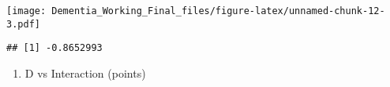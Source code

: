 \documentclass[]{article}
\newenvironment{Shaded}{\begin{snugshade}}{\end{snugshade}}
\newcommand{\KeywordTok}[1]{\textcolor[rgb]{0.13,0.29,0.53}{\textbf{#1}}}
\newcommand{\NormalTok}[1]{#1}
\newcommand{\OperatorTok}[1]{\textcolor[rgb]{0.81,0.36,0.00}{\textbf{#1}}}
\providecommand{\tightlist}{%
  \setlength{\itemsep}{0pt}\setlength{\parskip}{0pt}}
\begin{document}
\texttt{[image: Dementia\_Working\_Final\_files/figure-latex/unnamed-chunk-12-3.pdf]}

\begin{Shaded}
\end{Shaded}

\begin{verbatim}
## [1] -0.8652993
\end{verbatim}

\begin{enumerate}
\def\labelenumi{\alph{enumi}.}
\setcounter{enumi}{3}
\tightlist
\item
  D vs Interaction (points)
\end{enumerate}
\end{document}
